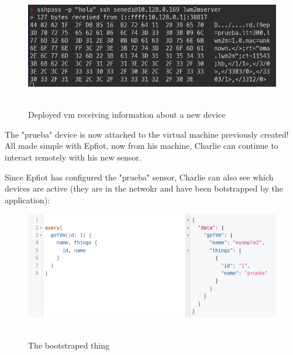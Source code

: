 \begin{figure}[h!]%
\centering
    \includegraphics[width=6.5in]{figures/bs_endpoint_log3.png}
~\caption{Deployed vm receiving information about a new device}
\label{figure6.16}
\end{figure}

The "prueba" device is now attached to the virtual machine previously created! All made simple with Epfiot, now from his machine, Charlie can continue to interact remotely with his new sensor.

Since Epfiot has configured the "prueba" sensor, Charlie can also see which devices are active (they are in the netwokr and have been botstrapped by the application):


\begin{figure}[h!]%
\centering
    \includegraphics[width=6.5in]{figures/attached_thing.png}
~\caption{The bootstraped thing}
\label{figure6.17}
\end{figure}

